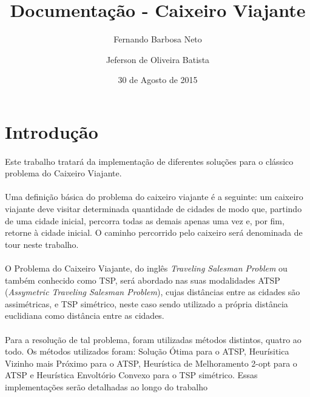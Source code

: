 \documentclass[12pt,a4paper]{article}
\title{Documentação - Caixeiro Viajante}
\author{Fernando Barbosa Neto \and Jeferson de Oliveira Batista}
\date{30 de Agosto de 2015}
\begin{document}
 \maketitle
 \newpage
 
 \section{Introdução}
  {\paragraph{} Este trabalho tratará da implementação de diferentes soluções para o clássico problema do Caixeiro Viajante. }
  {\paragraph{} Uma definição básica do problema do caixeiro viajante é a seguinte: um caixeiro viajante deve visitar determinada quantidade de cidades de modo que, partindo de uma cidade inicial, percorra todas as demais apenas uma vez e, por fim, retorne à cidade inicial. O caminho percorrido pelo caixeiro será denominada de tour neste trabalho. }
  {\paragraph{} O Problema do Caixeiro Viajante, do inglês {\it Traveling Salesman Problem} ou também conhecido como TSP, será abordado nas suas modalidades ATSP ({\it Assymetric Traveling Salesman Problem}), cujas distâncias entre as cidades são assimétricas, e TSP simétrico, neste caso sendo utilizado a própria distância euclidiana como distância entre as cidades. }
  {\paragraph{} Para a resolução de tal problema, foram utilizadas métodos distintos, quatro ao todo. Os métodos utilizados foram: Solução Ótima para o ATSP, Heurísitica Vizinho mais Próximo para o ATSP, Heurística de Melhoramento 2-opt para o ATSP e Heurística Envoltório Convexo para o TSP simétrico. Essas implementações serão detalhadas ao longo do trabalho }
 \newpage
 
\end{document}
